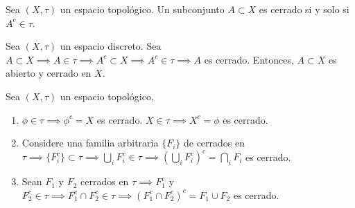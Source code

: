 \begin{definicion}
    Sea $(X,\tau)$ un espacio topológico. Un subconjunto $A\subset X$ es cerrado si y solo si $A^c\in\tau $.
\end{definicion}

\begin{ejemplo}
    Sea $(X,\tau)$ un espacio discreto. Sea $A\subset X\implies A\in\tau\implies A^c\subset X\implies A^c\in \tau\implies A$ es cerrado. Entonces, $A\subset X$ es abierto y cerrado en $X$. 
\end{ejemplo}

\begin{cajita}
    \begin{nota}
        Sea $(X,\tau)$ un espacio topológico,
        \begin{enumerate}
            \item $\phi\in \tau\implies \phi^c=X$ es cerrado. $X\in\tau\implies X^c=\phi$ es cerrado.
            \item Considere una familia arbitraria $\{F_i\}$ de cerrados en $\tau\implies \{F_i^c\}\subset \tau\implies \bigcup_i F_i^c\in \tau \implies \left(\bigcup_i F_i^c\right)^c=\bigcap_i F_i$ es cerrado. 
            \item Sean $F_1$ y $F_2$ cerrados en $\tau\implies F_1^c$ y $F_2^c\in\tau\implies F_1^c\cap F_2^c\in \tau\implies (F_1^c\cap F_2^c)^c=F_1\cup F_2$ es cerrado.   
        \end{enumerate}
    \end{nota}
\end{cajita}



